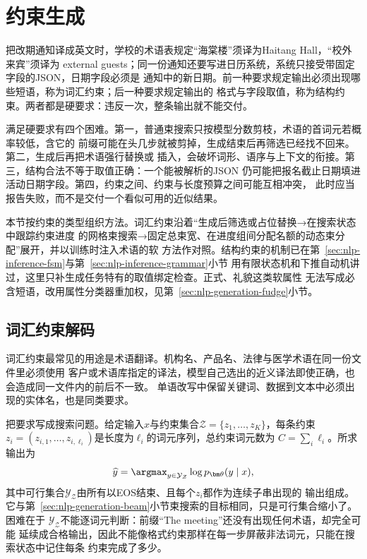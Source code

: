 \section{约束生成}
\label{sec:nlp-generation-constraints}

把改期通知译成英文时，学校的术语表规定“海棠楼”须译为Haitang Hall，“校外来宾”须译为
external guests；同一份通知还要写进日历系统，系统只接受带固定字段的JSON，日期字段必须是
通知中的新日期。前一种要求规定输出必须出现哪些短语，称为词汇约束；后一种要求规定输出的
格式与字段取值，称为结构约束。两者都是硬要求：违反一次，整条输出就不能交付。

满足硬要求有四个困难。第一，普通束搜索只按模型分数剪枝，术语的首词元若概率较低，含它的
前缀可能在头几步就被剪掉，生成结束后再筛选已经找不回来。第二，生成后再把术语强行替换或
插入，会破坏词形、语序与上下文的衔接。第三，结构合法不等于取值正确：一个能被解析的JSON
仍可能把报名截止日期填进活动日期字段。第四，约束之间、约束与长度预算之间可能互相冲突，
此时应当报告失败，而不是交付一个看似可用的近似结果。

本节按约束的类型组织方法。词汇约束沿着“生成后筛选或占位替换→在搜索状态中跟踪约束进度
的网格束搜索→固定总束宽、在进度组间分配名额的动态束分配”展开，并以训练时注入术语的软
方法作对照。结构约束的机制已在第~\ref{sec:nlp-inference-fsm}与第~\ref{sec:nlp-inference-grammar}小节
用有限状态机和下推自动机讲过，这里只补生成任务特有的取值绑定检查。正式、礼貌这类软属性
无法写成必含短语，改用属性分类器重加权，见第~\ref{sec:nlp-generation-fudge}小节。

\subsection{词汇约束解码}
\label{sec:nlp-generation-lexical-constraints}

词汇约束最常见的用途是术语翻译。机构名、产品名、法律与医学术语在同一份文件里必须使用
客户或术语库指定的译法，模型自己选出的近义译法即使正确，也会造成同一文件内的前后不一致。
单语改写中保留关键词、数据到文本中必须出现的实体名，也是同类要求。

把要求写成搜索问题。给定输入$x$与约束集合$\mathcal Z=\{z_1,\ldots,z_K\}$，每条约束
$z_i=(z_{i,1},\ldots,z_{i,\ell_i})$是长度为$\ell_i$的词元序列，总约束词元数为
$C=\sum_{i}\ell_i$。所求输出为
\begin{equation}
  \widehat y=\argmax_{y\in\mathcal Y_{\mathcal Z}}\log p_{\bm\theta}(y\mid x),
  \label{eq:nlp-generation-lexical-objective}
\end{equation}
其中可行集合$\mathcal Y_{\mathcal Z}$由所有以EOS结束、且每个$z_i$都作为连续子串出现的
输出组成。
它与第~\ref{sec:nlp-generation-beam}小节束搜索的目标相同，只是可行集合缩小了。困难在于
$\mathcal Y_{\mathcal Z}$不能逐词元判断：前缀“The meeting”还没有出现任何术语，却完全可能
延续成合格输出，因此不能像格式约束那样在每一步屏蔽非法词元，只能在搜索状态中记住每条
约束完成了多少。

